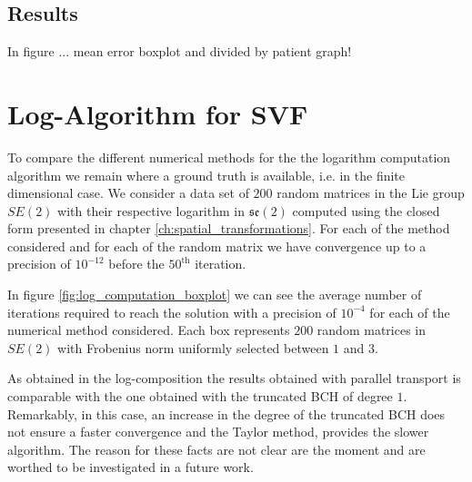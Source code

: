 \subsection{Results}
In figure ... mean error boxplot and divided by patient graph!



\section{Log-Algorithm for SVF}

To compare the different numerical methods for the the logarithm computation algorithm we remain where a ground truth is available, i.e. in the finite dimensional case. We consider a data set of $200$ random matrices in the Lie group $SE(2)$ with their respective logarithm in $\mathfrak{se}(2)$ computed using the closed form presented in chapter \ref{ch:spatial_transformations}. For each of the method considered and for each of the random matrix we have convergence up to a precision of $10^{-12}$ before the $50^{\text{th}}$ iteration.

In figure \ref{fig:log_computation_boxplot} we can see the average number of iterations required to reach the solution with a precision of $10^{-4}$ for each of the numerical method considered. Each box represents $200$ random matrices in $SE(2)$ with Frobenius norm uniformly selected between $1$ and $3$.

As obtained in the log-composition the results obtained with parallel transport is comparable with the one obtained with the truncated BCH of degree $1$. Remarkably, in this case, an increase in the degree of the truncated BCH does not ensure a faster convergence and the Taylor method, provides the slower algorithm. The reason for these facts are not clear are the moment and are worthed to be investigated in a future work.

